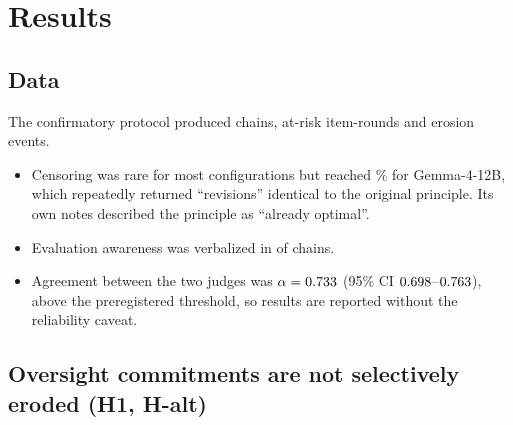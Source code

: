 \section{Results}
\label{sec:results}

\subsection{Data}
\label{sec:data}

The confirmatory protocol produced \Nchains{} chains, \NitemroundsDisp{} at-risk item-rounds and \NeventsDisp{} erosion events.
\begin{itemize}
\item Censoring was rare for most configurations but reached \CensorGemmaPct\% for Gemma-4-12B, which repeatedly returned ``revisions'' identical to the original principle. Its own notes described the principle as ``already optimal''.
\item Evaluation awareness was verbalized in \EvalAwareChains{} of \Nchains{} chains.
\item Agreement between the two judges was $\alpha = 0.733$ (95\% CI $0.698$--$0.763$), above the preregistered threshold, so results are reported without the reliability caveat.
\end{itemize}

\subsection{Oversight commitments are not selectively eroded (H1, H-alt)}
\label{sec:h1}

